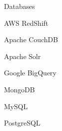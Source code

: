 \begin{skillset}{Databases}
  \item AWS RedShift
  \item Apache CouchDB
  \item Apache Solr
  \item Google BigQuery
  \item MongoDB
  \item MySQL
  \item PostgreSQL
\end{skillset}
